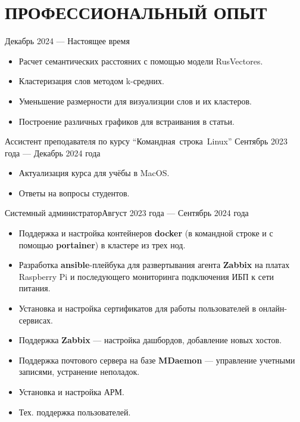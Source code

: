 \section{ПРОФЕССИОНАЛЬНЫЙ ОПЫТ}

    {Декабрь 2024 --- Настоящее время}
    
\begin{itemize}
  \setlength\itemsep{-.5em}
\item Расчет семантических расстояних с помощью модели RusVectores.
\item Кластеризация слов методом k-средних.
\item Уменьшение размерности для визуализции слов и их кластеров.
\item Построение различных графиков для встраивания в статьи.
\end{itemize}
      

 {Ассистент преподавателя по курсу
  “\mbox{Командная}~строка~Linux”} {Сентябрь 2023 года --- Декабрь
  2024 года}
\begin{itemize}
  \setlength\itemsep{-.5em}
\item Актуализация курса для учёбы в MacOS.
\item Ответы на вопросы студентов.
\end{itemize}

\vspace{-0.5em}

 {Системный администратор}{Август 2023 года ---
  Сентябрь 2024 года}
\begin{itemize}
  \setlength\itemsep{-.5em}
\item Поддержка и настройка контейнеров \textbf{docker} (в командной
  строке и с помощью \textbf{portainer}) в кластере из трех нод.
\item Разработка \textbf{ansible}-плейбука для развертывания агента
  \textbf{Zabbix} на платах Raspberry Pi и последующего мониторинга
  подключения ИБП к сети питания.
\item Установка и настройка сертификатов для работы пользователей в
  онлайн-сервисах.
\item Поддержка \textbf{Zabbix} — настройка дашбордов, добавление
  новых хостов.
\item Поддержка почтового сервера на базе \textbf{MDaemon} —
  управление учетными записями, устранение неполадок.
\item Установка и настройка АРМ.
\item Тех. поддержка пользователей.
\end{itemize}

